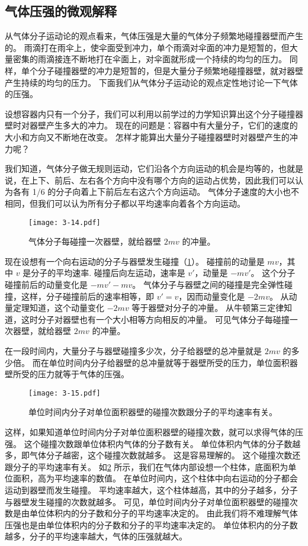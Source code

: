 \subsection{气体压强的微观解释} 
从气体分子运动论的观点看来，气体压强是大量的气体分子频繁地碰撞器壁而产生的。
雨滴打在雨伞上，使伞面受到冲力，单个雨滴对伞面的冲力是短暂的，但大量密集的雨滴接连不断地打在伞面上，对伞面就形成一个持续的均匀的压力。
同样，单个分子碰撞器壁的冲力是短暂的，但是大量分子频繁地碰撞器壁，就对器壁产生持续的均匀的压力。
下面我们从气体分子运动论的观点定性地讨论一下气体的压强。

设想容器内只有一个分子，我们可以利用以前学过的力学知识算出这个分子碰撞器壁时对器壁产生多大的冲力。
现在的问题是：容器中有大量分子，它们的速度的大小和方向又不断地在改变。
怎样才能算出大量分子碰撞器壁时对器壁产生的冲力呢？

我们知道，气体分子做无规则运动，它们沿各个方向运动的机会是均等的，也就是说，在上下、前后、左右各个方向中没有哪个方向的运动占优势，因此我们可以认为各有 1/6 的分子向着上下前后左右这六个方向运动。
气体分子速度的大小也不相同，但我们可以认为所有分子都以平均速率向着各个方向运动。

\begin{figure}
	\texttt{[image: 3-14.pdf]}
	\caption{气体分子每碰撞一次器壁，就给器壁 $2mv$ 的冲量。}\label{fig:3-14}
\end{figure}

现在设想有一个向右运动的分子与器壁发生碰撞（\cref{fig:3-14}）。
碰撞前的动量是 $mv$，其中 $v$ 是分子的平均速率.
碰撞后向左运动，速率是 $v'$，动量是 $-mv'$。
这个分子碰撞前后的动量变化是 $-mv'-mv$。
气体分子与器壁之间的碰撞是完全弹性碰撞，这样，分子碰撞前后的速率相等，即 $v'=v$，因而动量变化是 $-2mv$。
从动量定理知道，这个动量变化 $-2mv$ 等于器壁对分子的冲量。
从牛顿第三定律知道，这时分子对器壁也有一个大小相等方向相反的冲量。
可见气体分子每碰撞一次器壁，就给器壁 $2mv$ 的冲量。

在一段时间内，大量分子与器壁碰撞多少次，分子给器壁的总冲量就是 $2mv$ 的多少倍。
而在单位时间内分子给器壁的总冲量就等于器壁所受的压力，单位面积器壁所受的压力就等于气体的压强。

\begin{figure}
	\texttt{[image: 3-15.pdf]}
	\caption{单位时间内分子对单位面积器壁的碰撞次数跟分子的平均速率有关。}\label{fig:3-15}
\end{figure}

这样，如果知道单位时间内分子对单位面积器壁的碰撞次数，就可以求得气体的压强。
这个碰撞次数跟单位体积内气体的分子数有关。
单位体积内气体的分子数越多，即气体分子越密，这个碰撞次数就越多。
这是容易理解的。
这个碰撞次数还跟分子的平均速率有关。
如\cref{fig:3-15} 所示，我们在气体内部设想一个柱体，底面积为单位面积，高为平均速率的数值。
在单位时间内，这个柱体中向右运动的分子都会运动到器壁而发生碰撞。
平均速率越大，这个柱体越高，其中的分子越多，分子与器壁发生碰撞的次数就越多。
可见，单位时间内分子对单位面积器壁的碰撞次数是由单位体积内的分子数和分子的平均速率决定的。
由此我们将不难理解气体压强也是由单位体积内的分子数和分子的平均速率决定的。
单位体积内的分子数越多，分子的平均速率越大，气体的压强就越大。

